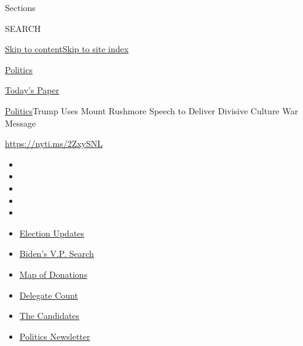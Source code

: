Sections

SEARCH

\protect\hyperlink{site-content}{Skip to
content}\protect\hyperlink{site-index}{Skip to site index}

\href{https://www.nytimes.com/section/politics}{Politics}

\href{https://myaccount.nytimes.com/auth/login?response_type=cookie\&client_id=vi}{}

\href{https://www.nytimes.com/section/todayspaper}{Today's Paper}

\href{/section/politics}{Politics}\textbar{}Trump Uses Mount Rushmore
Speech to Deliver Divisive Culture War Message

\url{https://nyti.ms/2ZxySNL}

\begin{itemize}
\item
\item
\item
\item
\item
\end{itemize}

\begin{itemize}
\item
  \href{https://www.nytimes.com/2020/07/31/us/elections/biden-vs-trump.html?action=click\&pgtype=Article\&state=default\&region=TOP_BANNER\&context=storylines_menu}{Election
  Updates}
\item
  \href{https://www.nytimes.com/article/biden-vice-president-2020.html?action=click\&pgtype=Article\&state=default\&region=TOP_BANNER\&context=storylines_menu}{Biden's
  V.P. Search}
\item
  \href{https://www.nytimes.com/interactive/2020/07/24/us/politics/trump-biden-campaign-donors.html?action=click\&pgtype=Article\&state=default\&region=TOP_BANNER\&context=storylines_menu}{Map
  of Donations}
\item
  \href{https://www.nytimes.com/interactive/2020/us/elections/delegate-count-primary-results.html?action=click\&pgtype=Article\&state=default\&region=TOP_BANNER\&context=storylines_menu}{Delegate
  Count}
\item
  \href{https://www.nytimes.com/interactive/2019/us/politics/2020-presidential-candidates.html?action=click\&pgtype=Article\&state=default\&region=TOP_BANNER\&context=storylines_menu}{The
  Candidates}
\item
  \href{https://www.nytimes.com/newsletters/politics?action=click\&pgtype=Article\&state=default\&region=TOP_BANNER\&context=storylines_menu}{Politics
  Newsletter}
\end{itemize}

